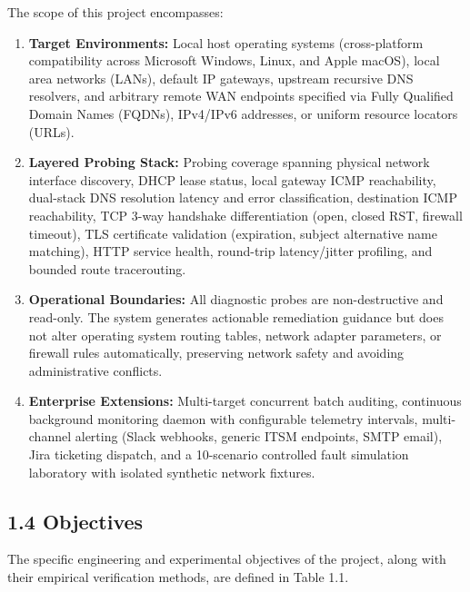 \documentclass[
]{article}
\providecommand{\tightlist}{%
  \setlength{\itemsep}{0pt}\setlength{\parskip}{0pt}}
\begin{document}
The scope of this project encompasses:
\begin{enumerate}
\tightlist
\item \textbf{Target Environments:} Local host operating systems (cross-platform compatibility across Microsoft Windows, Linux, and Apple macOS), local area networks (LANs), default IP gateways, upstream recursive DNS resolvers, and arbitrary remote WAN endpoints specified via Fully Qualified Domain Names (FQDNs), IPv4/IPv6 addresses, or uniform resource locators (URLs).
\item \textbf{Layered Probing Stack:} Probing coverage spanning physical network interface discovery, DHCP lease status, local gateway ICMP reachability, dual-stack DNS resolution latency and error classification, destination ICMP reachability, TCP 3-way handshake differentiation (open, closed RST, firewall timeout), TLS certificate validation (expiration, subject alternative name matching), HTTP service health, round-trip latency/jitter profiling, and bounded route tracerouting.
\item \textbf{Operational Boundaries:} All diagnostic probes are non-destructive and read-only. The system generates actionable remediation guidance but does not alter operating system routing tables, network adapter parameters, or firewall rules automatically, preserving network safety and avoiding administrative conflicts.
\item \textbf{Enterprise Extensions:} Multi-target concurrent batch auditing, continuous background monitoring daemon with configurable telemetry intervals, multi-channel alerting (Slack webhooks, generic ITSM endpoints, SMTP email), Jira ticketing dispatch, and a 10-scenario controlled fault simulation laboratory with isolated synthetic network fixtures.
\end{enumerate}

\subsection{1.4 Objectives}\label{objectives}

The specific engineering and experimental objectives of the project, along with their empirical verification methods, are defined in Table 1.1.
\end{document}
